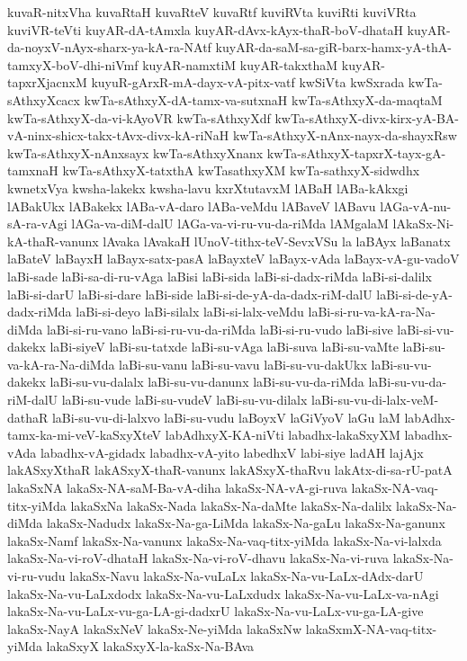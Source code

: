 {kuvaR-nitxVha
kuvaRtaH
kuvaRteV
kuvaRtf
kuviRVta
kuviRti
kuviVRta
kuviVR-teVti
kuyAR-dA-tAmxla
kuyAR-dAvx-kAyx-thaR-boV-dhataH
kuyAR-da-noyxV-nAyx-sharx-ya-kA-ra-NAtf
kuyAR-da-saM-sa-giR-barx-hamx-yA-thA-tamxyX-boV-dhi-niVmf
kuyAR-namxtiM
kuyAR-takxthaM
kuyAR-tapxrXjacnxM
kuyuR-gArxR-mA-dayx-vA-pitx-vatf
kwSiVta
kwSxrada
kwTa-sAthxyXcacx
kwTa-sAthxyX-dA-tamx-va-sutxnaH
kwTa-sAthxyX-da-maqtaM
kwTa-sAthxyX-da-vi-kAyoVR
kwTa-sAthxyXdf
kwTa-sAthxyX-divx-kirx-yA-BA-vA-ninx-shicx-takx-tAvx-divx-kA-riNaH
kwTa-sAthxyX-nAnx-nayx-da-shayxRsw
kwTa-sAthxyX-nAnxsayx
kwTa-sAthxyXnanx
kwTa-sAthxyX-tapxrX-tayx-gA-tamxnaH
kwTa-sAthxyX-tatxthA
kwTasathxyXM
kwTa-sathxyX-sidwdhx
kwnetxVya
kwsha-lakekx
kwsha-lavu
kxrXtutavxM
lABaH
lABa-kAkxgi
lABakUkx
lABakekx
lABa-vA-daro
lABa-veMdu
lABaveV
lABavu
lAGa-vA-nu-sA-ra-vAgi
lAGa-va-diM-dalU
lAGa-va-vi-ru-vu-da-riMda
lAMgalaM
lAkaSx-Ni-kA-thaR-vanunx
lAvaka
lAvakaH
lUnoV-tithx-teV-SevxVSu
la
laBAyx
laBanatx
laBateV
laBayxH
laBayx-satx-pasA
laBayxteV
laBayx-vAda
laBayx-vA-gu-vadoV
laBi-sade
laBi-sa-di-ru-vAga
laBisi
laBi-sida
laBi-si-dadx-riMda
laBi-si-dalilx
laBi-si-darU
laBi-si-dare
laBi-side
laBi-si-de-yA-da-dadx-riM-dalU
laBi-si-de-yA-dadx-riMda
laBi-si-deyo
laBi-silalx
laBi-si-lalx-veMdu
laBi-si-ru-va-kA-ra-Na-diMda
laBi-si-ru-vano
laBi-si-ru-vu-da-riMda
laBi-si-ru-vudo
laBi-sive
laBi-si-vu-dakekx
laBi-siyeV
laBi-su-tatxde
laBi-su-vAga
laBi-suva
laBi-su-vaMte
laBi-su-va-kA-ra-Na-diMda
laBi-su-vanu
laBi-su-vavu
laBi-su-vu-dakUkx
laBi-su-vu-dakekx
laBi-su-vu-dalalx
laBi-su-vu-danunx
laBi-su-vu-da-riMda
laBi-su-vu-da-riM-dalU
laBi-su-vude
laBi-su-vudeV
laBi-su-vu-dilalx
laBi-su-vu-di-lalx-veM-dathaR
laBi-su-vu-di-lalxvo
laBi-su-vudu
laBoyxV
laGiVyoV
laGu
laM
labAdhx-tamx-ka-mi-veV-kaSxyXteV
labAdhxyX-KA-niVti
labadhx-lakaSxyXM
labadhx-vAda
labadhx-vA-gidadx
labadhx-vA-yito
labedhxV
labi-siye
ladAH
lajAjx
lakASxyXthaR
lakASxyX-thaR-vanunx
lakASxyX-thaRvu
lakAtx-di-sa-rU-patA
lakaSxNA
lakaSx-NA-saM-Ba-vA-diha
lakaSx-NA-vA-gi-ruva
lakaSx-NA-vaq-titx-yiMda
lakaSxNa
lakaSx-Nada
lakaSx-Na-daMte
lakaSx-Na-dalilx
lakaSx-Na-diMda
lakaSx-Nadudx
lakaSx-Na-ga-LiMda
lakaSx-Na-gaLu
lakaSx-Na-ganunx
lakaSx-Namf
lakaSx-Na-vanunx
lakaSx-Na-vaq-titx-yiMda
lakaSx-Na-vi-lalxda
lakaSx-Na-vi-roV-dhataH
lakaSx-Na-vi-roV-dhavu
lakaSx-Na-vi-ruva
lakaSx-Na-vi-ru-vudu
lakaSx-Navu
lakaSx-Na-vuLaLx
lakaSx-Na-vu-LaLx-dAdx-darU
lakaSx-Na-vu-LaLxdodx
lakaSx-Na-vu-LaLxdudx
lakaSx-Na-vu-LaLx-va-nAgi
lakaSx-Na-vu-LaLx-vu-ga-LA-gi-dadxrU
lakaSx-Na-vu-LaLx-vu-ga-LA-give
lakaSx-NayA
lakaSxNeV
lakaSx-Ne-yiMda
lakaSxNw
lakaSxmX-NA-vaq-titx-yiMda
lakaSxyX
lakaSxyX-la-kaSx-Na-BAva
}
